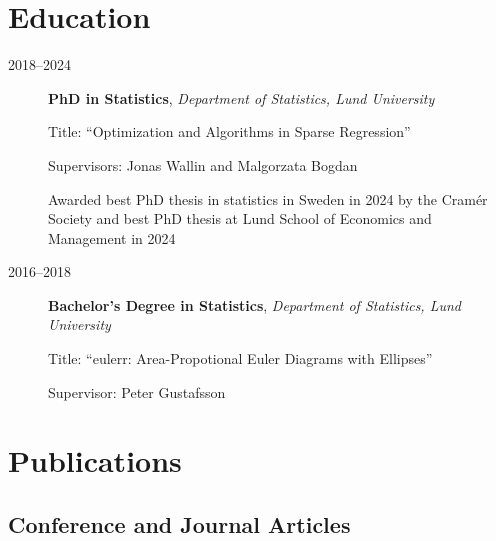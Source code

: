 \documentclass[
  a4paper,
]{article}
\begin{document}
\section{Education}\label{education}

\begin{description}
\item[2018--2024]
\textbf{PhD in Statistics}, \emph{Department of Statistics, Lund
University}

Title: ``Optimization and Algorithms in Sparse Regression''

Supervisors: Jonas Wallin and Malgorzata Bogdan

Awarded best PhD thesis in statistics in Sweden in 2024 by the Cramér
Society and best PhD thesis at Lund School of Economics and Management
in 2024
\item[2016--2018]
\textbf{Bachelor's Degree in Statistics}, \emph{Department of
Statistics, Lund University}

Title: ``eulerr: Area-Propotional Euler Diagrams with Ellipses''

Supervisor: Peter Gustafsson
\end{description}

\section{Publications}\label{publications}

\subsection{Conference and Journal
Articles}\label{conference-and-journal-articles}
\end{document}
